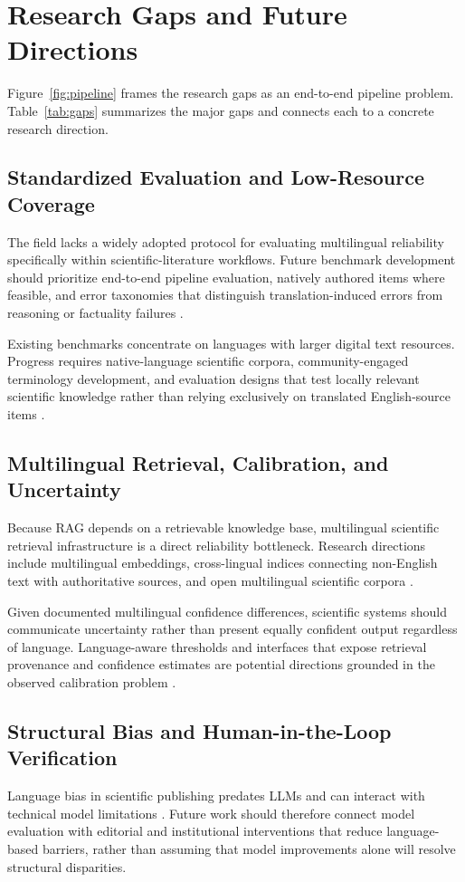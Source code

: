 \documentclass[acmsmall,nonacm]{acmart}
\begin{document}
\section{Research Gaps and Future Directions}\label{sec:gaps}
Figure~\ref{fig:pipeline} frames the research gaps as an end-to-end pipeline problem. Table~\ref{tab:gaps} summarizes the major gaps and connects each to a concrete research direction.

\subsection{Standardized Evaluation and Low-Resource Coverage}
The field lacks a widely adopted protocol for evaluating multilingual reliability specifically within scientific-literature workflows. Future benchmark development should prioritize end-to-end pipeline evaluation, natively authored items where feasible, and error taxonomies that distinguish translation-induced errors from reasoning or factuality failures \cite{Huang2025,Xuan2025}.

Existing benchmarks concentrate on languages with larger digital text resources. Progress requires native-language scientific corpora, community-engaged terminology development, and evaluation designs that test locally relevant scientific knowledge rather than relying exclusively on translated English-source items \cite{Qin2025,Xuan2025}.

\subsection{Multilingual Retrieval, Calibration, and Uncertainty}
Because RAG depends on a retrievable knowledge base, multilingual scientific retrieval infrastructure is a direct reliability bottleneck. Research directions include multilingual embeddings, cross-lingual indices connecting non-English text with authoritative sources, and open multilingual scientific corpora \cite{Lewis2020}.

Given documented multilingual confidence differences, scientific systems should communicate uncertainty rather than present equally confident output regardless of language. Language-aware thresholds and interfaces that expose retrieval provenance and confidence estimates are potential directions grounded in the observed calibration problem \cite{Xue2024}.

\subsection{Structural Bias and Human-in-the-Loop Verification}
Language bias in scientific publishing predates LLMs and can interact with technical model limitations \cite{Amano2023}. Future work should therefore connect model evaluation with editorial and institutional interventions that reduce language-based barriers, rather than assuming that model improvements alone will resolve structural disparities.
\end{document}
